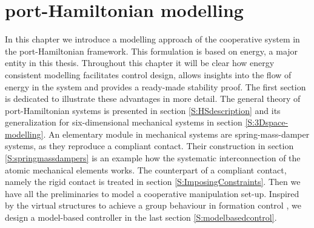 \documentclass[a4paper,twoside, openright,12pt]{report}
\begin{document}
{\chapter{port-Hamiltonian modelling}\label{C:pHS modelling}
In this chapter we introduce a modelling approach of the cooperative system in the port-Hamiltonian framework. This formulation is based on energy, a major entity in this thesis. Throughout this chapter it will be clear how energy consistent modelling facilitates control design, allows insights into the flow of energy in the system and provides a ready-made stability proof. The first section is dedicated to illustrate these advantages in more detail. The general theory of port-Hamiltonian systems is presented in section \ref{S:HSdescription} and its  generalization for six-dimensional mechanical systems in section \ref{S:3Dspace-modelling}. An elementary module in mechanical systems are spring-mass-damper systems, as they reproduce a compliant contact. Their construction in section \ref{S:springmassdampers} is an example how the systematic interconnection of the atomic mechanical elements works. The counterpart of a compliant contact, namely the rigid contact is treated in section \ref{S:ImposingConstraints}. Then we have all the preliminaries to model a cooperative manipulation set-up. Inspired by the virtual structures to achieve a group behaviour in formation control \cite{Lawton_03}, we design a model-based controller in the last section \ref{S:modelbasedcontrol}.
  
}
\end{document}
